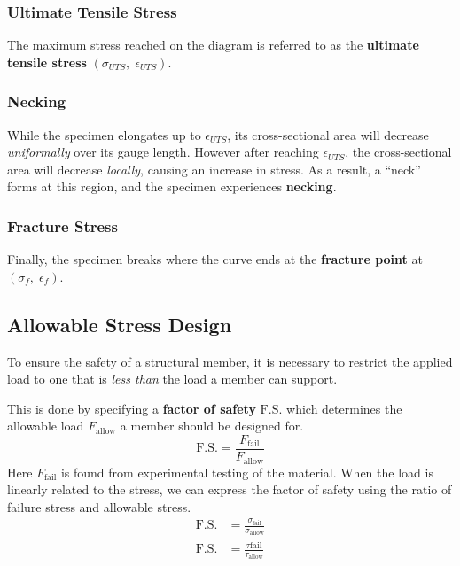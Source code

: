 \documentclass{article}
\begin{document}
\subsubsection{Ultimate Tensile Stress}
The maximum stress reached on the diagram is referred to as the \textbf{ultimate tensile stress} \(\left( \sigma_{UTS},\; \epsilon_{UTS} \right)\).
\subsubsection{Necking}
While the specimen elongates up to \(\epsilon_{UTS}\), its cross-sectional area will decrease \textit{uniformally} over its gauge length.
However after reaching \(\epsilon_{UTS}\), the cross-sectional area will decrease \textit{locally}, causing an increase in stress.
As a result, a ``neck'' forms at this region, and the specimen experiences \textbf{necking}.
\subsubsection{Fracture Stress}
Finally, the specimen breaks where the curve ends at the \textbf{fracture point} at \(\left( \sigma_f,\; \epsilon_f \right)\).
\subsection{Allowable Stress Design}
To ensure the safety of a structural member, it is necessary to restrict the applied load
to one that is \textit{less than} the load a member can support.

This is done by specifying a \textbf{factor of safety} \(\mathrm{F.S.}\) which
determines the allowable load \(F_{\mathrm{allow}}\) a member should be designed for.
\begin{equation*}
    \mathrm{F.S.} = \frac{F_{\mathrm{fail}}}{F_{\mathrm{allow}}}
\end{equation*}
Here \(F_{\mathrm{fail}}\) is found from experimental testing of the material. When the load is linearly
related to the stress, we can express the factor of safety using the ratio of failure stress and
allowable stress.
\begin{align*}
    \mathrm{F.S.} & = \frac{\sigma_{\mathrm{fail}}}{\sigma_{\mathrm{allow}}} \\
    \mathrm{F.S.} & = \frac{\tau{\mathrm{fail}}}{\tau_{\mathrm{allow}}}
\end{align*}
\end{document}
